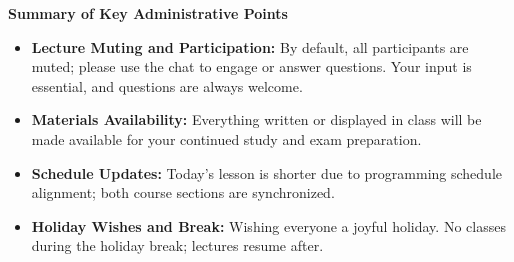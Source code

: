 \documentclass[12pt]{article}
\theoremstyle{definition}
\begin{document}
\vspace{0.5cm}

\begin{administrative_note}
\textbf{Summary of Key Administrative Points}
\begin{itemize}[leftmargin=2em]
    \item \textbf{Lecture Muting and Participation:} By default, all participants are muted; please use the chat to engage or answer questions. Your input is essential, and questions are always welcome.
    \item \textbf{Materials Availability:} Everything written or displayed in class will be made available for your continued study and exam preparation.
    \item \textbf{Schedule Updates:} Today's lesson is shorter due to programming schedule alignment; both course sections are synchronized.
    \item \textbf{Holiday Wishes and Break:} Wishing everyone a joyful holiday. No classes during the holiday break; lectures resume after.
\end{itemize}
\end{administrative_note}
\end{document}
